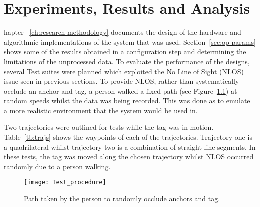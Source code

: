 \chapter{Experiments, Results and Analysis}\label{ch:design-experiments}
hapter ~\ref{ch:research-methodology} documents the design of the hardware and algorithmic implementations of the system that was used.
Section~\ref{sec:op-params} shows some of the results obtained in a configuration step and determining the limitations of the unprocessed data.
To evaluate the performance of the designs, several Test suites were planned which exploited the No Line of Sight (NLOS) issue seen in previous sections.
To provide NLOS, rather than systematically occlude an anchor and tag, a person walked a fixed path (see Figure~\ref{fig:occlude}) at random speeds whilst the data was being recorded.
This was done as to emulate a more realistic environment that the system would be used in.

Two trajectories were outlined for tests while the tag was in motion.
Table~\ref{tb:trajs} shows the waypoints of each of the trajectories.
Trajectory one is a quadrilateral whilst trajectory two is a combination of straight-line segments.
In these tests, the tag was moved along the chosen trajectory whilst NLOS occurred randomly due to a person walking.

\begin{figure}[ht!]
    \centering
    \texttt{[image: Test\_procedure]}
    \caption{Path taken by the person to randomly occlude anchors and tag.}
    \label{fig:occlude}
\end{figure}

